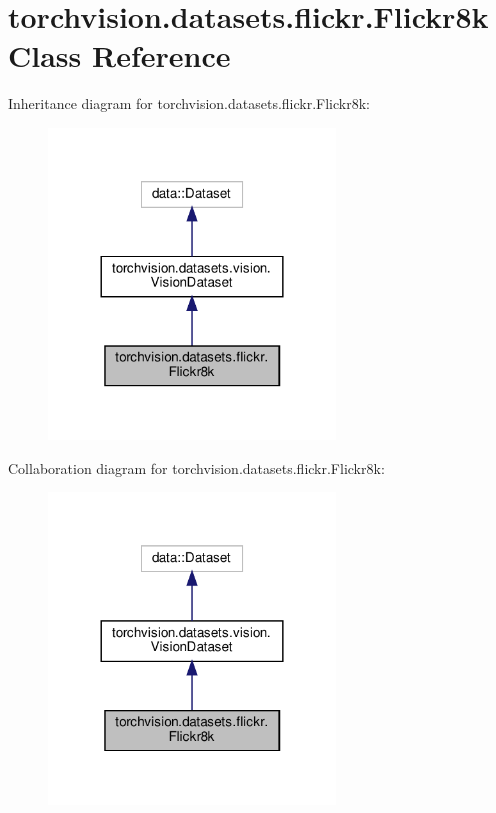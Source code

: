 \hypertarget{classtorchvision_1_1datasets_1_1flickr_1_1Flickr8k}{}\section{torchvision.\+datasets.\+flickr.\+Flickr8k Class Reference}
\label{classtorchvision_1_1datasets_1_1flickr_1_1Flickr8k}


Inheritance diagram for torchvision.\+datasets.\+flickr.\+Flickr8k\+:
\nopagebreak
\begin{figure}[H]
\begin{center}
\leavevmode
\includegraphics[width=216pt]{classtorchvision_1_1datasets_1_1flickr_1_1Flickr8k__inherit__graph}
\end{center}
\end{figure}


Collaboration diagram for torchvision.\+datasets.\+flickr.\+Flickr8k\+:
\nopagebreak
\begin{figure}[H]
\begin{center}
\leavevmode
\includegraphics[width=216pt]{classtorchvision_1_1datasets_1_1flickr_1_1Flickr8k__coll__graph}
\end{center}
\end{figure}
